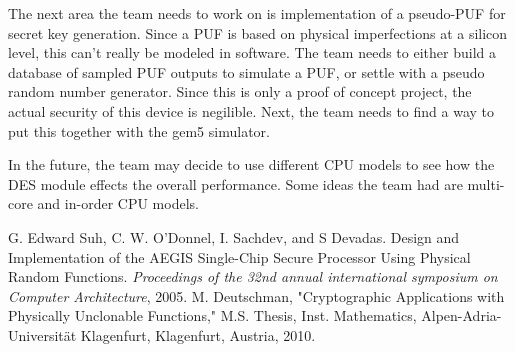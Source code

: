 \documentclass[letterpaper, 10 pt, conference]{ieeeconf}  %
\begin{document}
The next area the team needs to work on is implementation of a pseudo-PUF for secret key generation. Since a PUF is based on physical imperfections at a silicon level, this can't really be modeled in software. The team needs to either build a database of sampled PUF outputs to simulate a PUF, or settle with a pseudo random number generator. Since this is only a proof of concept project, the actual security of this device is negilible. Next, the team needs to find a way to put
this together with the gem5 simulator. 

In the future, the team may decide to use different CPU models to see how the DES module effects the overall performance. Some ideas the team had are multi-core and in-order CPU models. 

\addtolength{\textheight}{-12cm}   %

















\begin{thebibliography}{99}

 G. Edward Suh, C. W. O'Donnel, I. Sachdev, and S Devadas. Design and Implementation of the AEGIS Single-Chip Secure Processor Using Physical Random Functions. \emph{Proceedings of the 32nd annual international symposium on Computer Architecture}, 2005.
 M. Deutschman, "Cryptographic Applications with Physically Unclonable Functions," M.S. Thesis, Inst. Mathematics, Alpen-Adria-Universit\"{a}t Klagenfurt, Klagenfurt, Austria, 2010.
 

\end{thebibliography}
\end{document}

